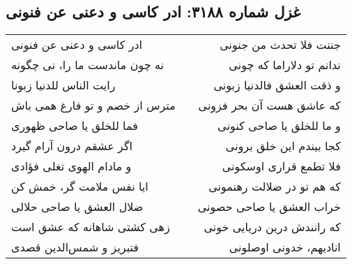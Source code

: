 \begin{center}
\section*{غزل شماره ۳۱۸۸: ادر کاسی و دعنی عن فنونی}
\label{sec:3188}
\begin{longtable}{l p{0.5cm} r}
ادر کاسی و دعنی عن فنونی
&&
جننت فلا تحدث من جنونی
\\
نه چون ماندست ما را، نی چگونه
&&
ندانم تو دلاراما که چونی
\\
رایت الناس للدنیا زبونا
&&
و ذقت العشق فالدنیا زبونی
\\
مترس از خصم و تو فارغ همی باش
&&
که عاشق هست آن بحر فزونی
\\
فما للخلق یا صاحی ظهوری
&&
و ما للخلق یا صاحی کنونی
\\
اگر عشقم درون آرام گیرد
&&
کجا بیندم این خلق برونی
\\
و مادام الهوی تغلی فؤادی
&&
فلا تطمع قراری اوسکونی
\\
ایا نفس ملامت گر، خمش کن
&&
که هم تو در ضلالت رهنمونی
\\
ضلال العشق یا صاحی حلالی
&&
خراب العشق یا صاحی حصونی
\\
زهی کشتی شاهانه که عشق است
&&
که رانندش درین دریایی خونی
\\
فتبریز و شمس‌الدین قصدی
&&
انادیهم، خدونی اوصلونی
\\
\end{longtable}
\end{center}

